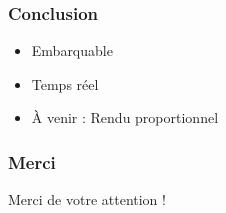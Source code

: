 \documentclass[12pt]{beamer}
\begin{document}
    \begin{frame}
    \frametitle{Conclusion}
    
    
    \Large
    \begin{itemize}
      \item Embarquable
      \item Temps réel
      \item \`A venir : Rendu proportionnel
    \end{itemize}
    
    \end{frame}

    \begin{frame}
    \frametitle{Merci}

    \Huge
    \begin{center}
    Merci de votre attention !
    
    \end{center}
    \end{frame}
    
    
\end{document}

